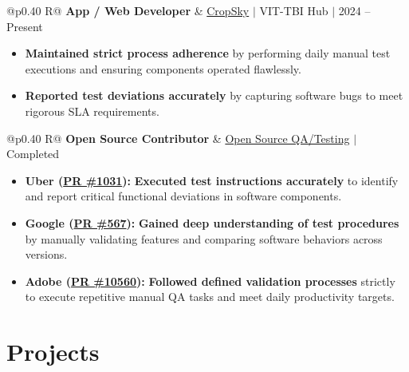 \documentclass[a4paper,11pt]{article}
\newcommand{\subheading}[1]{\textbf{#1}}
\newcommand{\meta}[1]{{\fontsize{10}{12}\selectfont\textcolor[HTML]{3A3A3A}{#1}}}
\newcommand{\ulink}[2]{\href{#1}{#2}}
\begin{document}
\begin{tabularx}{\linewidth}{@{}p{0.40\linewidth} R@{}}
\subheading{App / Web Developer} & \meta{\ulink{https://sites.google.com/view/cropsky/home}{CropSky} $|$ VIT-TBI Hub $|$ 2024 -- Present}
\end{tabularx}
\begin{itemize}[nosep, leftmargin=1.5em, itemsep=2pt, topsep=2pt]
  \item {\color[HTML]{0A0A0A}\fontsize{11}{14}\selectfont \textbf{Maintained strict process adherence} by performing daily manual test executions and ensuring components operated flawlessly.}
  \item {\color[HTML]{0A0A0A}\fontsize{11}{14}\selectfont \textbf{Reported test deviations accurately} by capturing software bugs to meet rigorous SLA requirements.}
\end{itemize}

\begin{tabularx}{\linewidth}{@{}p{0.40\linewidth} R@{}}
\subheading{Open Source Contributor} & \meta{\ulink{https://github.com/su-jin1425/My-Open-Source-Contributions}{Open Source QA/Testing} $|$ Completed}
\end{tabularx}
\begin{itemize}[nosep, leftmargin=1.5em, itemsep=2pt, topsep=2pt]
  \item {\color[HTML]{0A0A0A}\fontsize{11}{14}\selectfont \textbf{Uber (\ulink{https://github.com/uber/causalml/pull/1031}{PR \#1031}):} \textbf{Executed test instructions accurately} to identify and report critical functional deviations in software components.}
  \item {\color[HTML]{0A0A0A}\fontsize{11}{14}\selectfont \textbf{Google (\ulink{https://github.com/google/xrblocks/pull/567}{PR \#567}):} \textbf{Gained deep understanding of test procedures} by manually validating features and comparing software behaviors across versions.}
  \item {\color[HTML]{0A0A0A}\fontsize{11}{14}\selectfont \textbf{Adobe (\ulink{https://github.com/adobe/react-spectrum/pull/10560}{PR \#10560}):} \textbf{Followed defined validation processes} strictly to execute repetitive manual QA tasks and meet daily productivity targets.}
\end{itemize}

\section{Projects}
\vspace{2pt}
\end{document}
